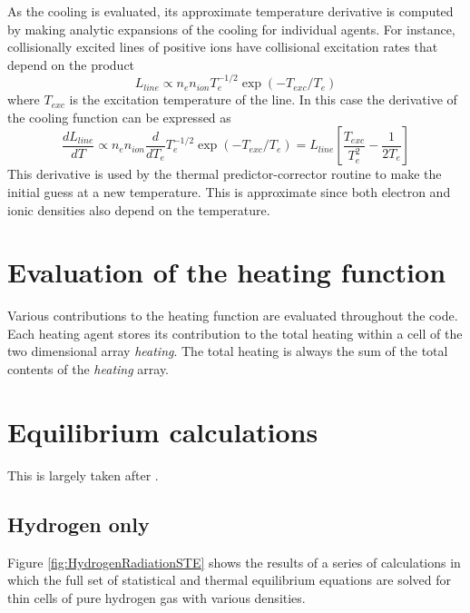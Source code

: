 As the cooling is evaluated, its approximate temperature derivative is
computed by making analytic expansions of the cooling for individual agents.
For instance, collisionally excited lines of positive ions have collisional
excitation rates that depend on the product
\begin{equation}
{L_{line}} \propto {n_e}{n_{ion}}T_e^{ - 1/2}\exp ( - {T_{exc}}/{T_e})
\end{equation}
where $T_{exc}$ is the excitation temperature of the line.  In this case the
derivative of the cooling function can be expressed as
\begin{equation}
\frac{{d{L_{line}}}}{{dT}} \propto {n_e}{n_{ion}}\frac{d}{{d{T_e}}}T_e^{
- 1/2}\exp ( - {T_{exc}}/{T_e}) = {L_{line}}\left[
{\frac{{{T_{exc}}}}{{T_e^2}} - \frac{1}{{2{T_e}}}} \right]
\end{equation}
This derivative is used by the thermal predictor-corrector routine to make
the initial guess at a new temperature.  This is approximate since both
electron and ionic densities also depend on the temperature.

\section{Evaluation of the heating function}

Various contributions to the heating function are evaluated throughout
the code.  Each heating agent stores its contribution to the total heating
within a cell of the two dimensional array \emph{heating}.   The total heating
is always the sum of the total contents of the \emph{heating} array.

\section{Equilibrium calculations}

This is largely taken after \citet{Ferland1988}.

\subsection{Hydrogen only}

Figure \ref{fig:HydrogenRadiationSTE} shows the results of a series of calculations in which the full
set of statistical and thermal equilibrium equations are solved for thin
cells of pure hydrogen gas with various densities.

